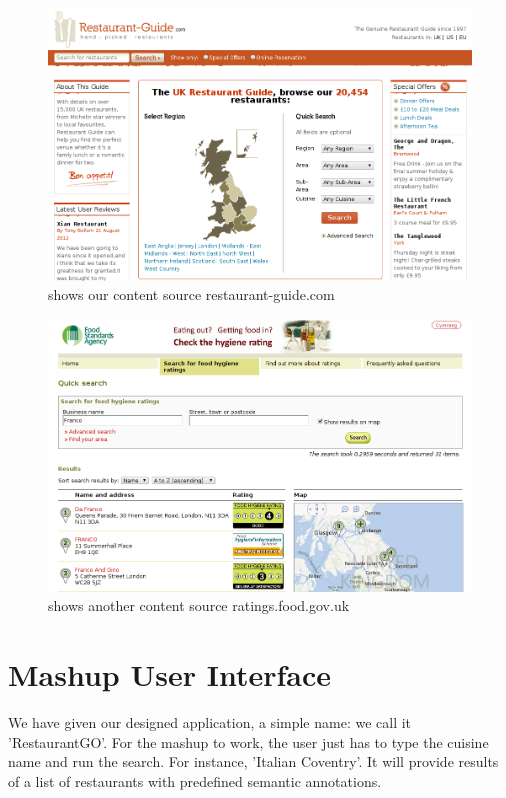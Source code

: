 \begin{figure}[!htb]
  \centering
  \includegraphics[width=16cm]{fig/restaurant_guide.png}
  \caption[ http://restaurant-guide.com]
  {shows our content source restaurant-guide.com}
\end{figure}

\begin{figure}[!htb]
  \centering
  \includegraphics[width=16cm]{fig/fsa_ratings.png}
  \caption[ http://ratings.food.gov.uk]
  {shows another content source ratings.food.gov.uk}
\end{figure}


\section{Mashup User Interface}

We have given our designed application, a simple name: we call it 'RestaurantGO'. For the mashup to work, the user just has to type the cuisine name and run the search. For instance, 'Italian Coventry'. It will provide results of a list of restaurants with predefined semantic annotations.

